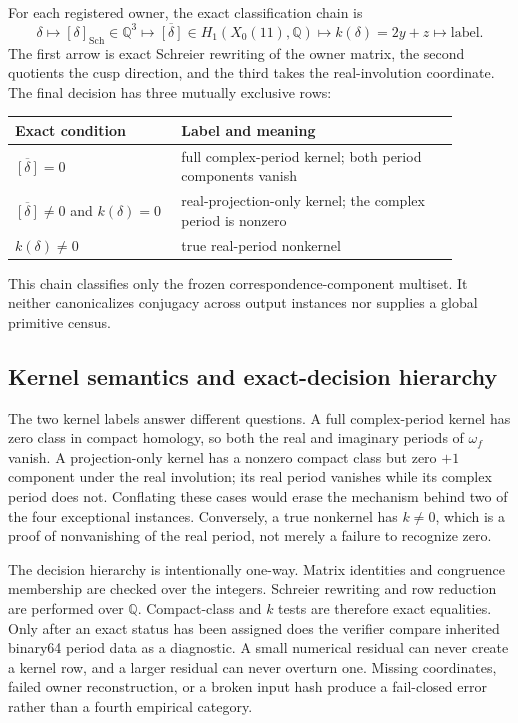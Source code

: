 \documentclass[11pt]{article}
\theoremstyle{definition}
\theoremstyle{remark}
\newcommand{\QQ}{\mathbb Q}
\begin{document}
For each registered owner, the exact classification chain is
\[
\delta
\longmapsto [\delta]_{\mathrm{Sch}}\in\QQ^3
\longmapsto \overline{[\delta]}\in H_1(X_0(11),\QQ)
\longmapsto k(\delta)=2y+z
\longmapsto \text{label}.
\]
The first arrow is exact Schreier rewriting of the owner matrix, the second quotients the cusp direction, and the third takes the real-involution coordinate. The final decision has three mutually exclusive rows:
\begin{center}
\small
\begin{tabular}{p{0.33\linewidth}p{0.55\linewidth}}
\toprule
Exact condition & Label and meaning\\
\midrule
$\overline{[\delta]}=0$ & full complex-period kernel; both period components vanish\\
$\overline{[\delta]}\neq0$ and $k(\delta)=0$ & real-projection-only kernel; the complex period is nonzero\\
$k(\delta)\neq0$ & true real-period nonkernel\\
\bottomrule
\end{tabular}
\end{center}
This chain classifies only the frozen correspondence-component multiset. It neither canonicalizes conjugacy across output instances nor supplies a global primitive census.

\subsection{Kernel semantics and exact-decision hierarchy}

The two kernel labels answer different questions. A full complex-period kernel has zero class in compact homology, so both the real and imaginary periods of $\omega_f$ vanish. A projection-only kernel has a nonzero compact class but zero $+1$ component under the real involution; its real period vanishes while its complex period does not. Conflating these cases would erase the mechanism behind two of the four exceptional instances. Conversely, a true nonkernel has $k\neq0$, which is a proof of nonvanishing of the real period, not merely a failure to recognize zero.

The decision hierarchy is intentionally one-way. Matrix identities and congruence membership are checked over the integers. Schreier rewriting and row reduction are performed over $\QQ$. Compact-class and $k$ tests are therefore exact equalities. Only after an exact status has been assigned does the verifier compare inherited binary64 period data as a diagnostic. A small numerical residual can never create a kernel row, and a larger residual can never overturn one. Missing coordinates, failed owner reconstruction, or a broken input hash produce a fail-closed error rather than a fourth empirical category.
\end{document}
